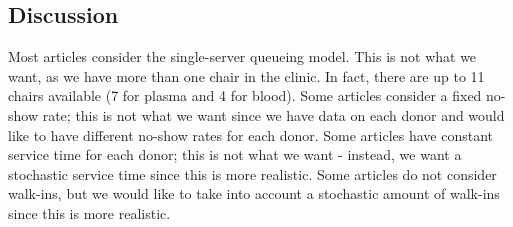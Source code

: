 \documentclass[a4paper,12pt]{article}
\begin{document}

\subsection{Discussion}


Most articles consider the single-server queueing model. This is not what we want, as we have more than one chair in the clinic. In fact, there are up to 11 chairs available (7 for plasma and 4 for blood). Some articles consider a fixed no-show rate; this is not what we want since we have data on each donor and would like to have different no-show rates for each donor. Some articles have constant service time for each donor; this is not what we want - instead, we want a stochastic service time since this is more realistic. Some articles do not consider walk-ins, but we would like to take into account a stochastic amount of walk-ins since this is more realistic.





\end{document}
